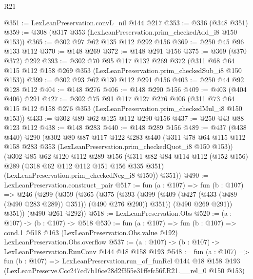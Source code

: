 \begin{lexlean}{R21}
\begin{coremodule}
@351 := LexLeanPreservation.convL_nil @144 @217
@353 := @336 (@348 @351)
@359 := @308 (@317 @353 (LexLeanPreservation.prim_checkedAdd_i8 @150 @153))
@365 := @302 @97 @62 @135 @112 @292 @156
@369 := @250 @45 @96 @133 @112
@370 := @148 @269
@372 := @148 @291 @156
@375 := @369 (@370 @372) @292
@393 := @302
    @70
    @95
    @117
    @132
    @269
    @372
    (@311 @68 @64 @115 @112 @158 @269 @353 (LexLeanPreservation.prim_checkedSub_i8 @150 @153))
@399 := @302 @93 @62 @130 @112 @291 @156
@403 := @250 @44 @92 @128 @112
@404 := @148 @276
@406 := @148 @290 @156
@409 := @403 (@404 @406) @291
@427 := @302
    @75
    @91
    @117
    @127
    @276
    @406
    (@311 @73 @64 @115 @112 @158 @276 @353 (LexLeanPreservation.prim_checkedMul_i8 @150 @153))
@433 := @302 @89 @62 @125 @112 @290 @156
@437 := @250 @43 @88 @123 @112
@438 := @148 @283
@440 := @148 @289 @156
@489 := @437
    (@438 @440)
    @290
    (@302
      @80
      @87
      @117
      @122
      @283
      @440
      (@311 @78 @64 @115 @112 @158 @283 @353 (LexLeanPreservation.prim_checkedQuot_i8 @150 @153))
      (@302
        @85
        @62
        @120
        @112
        @289
        @156
        (@311
          @82
          @84
          @114
          @112
          (@152 @156)
          @289
          (@318 @62 @112 @112 @151 @156 @335 @351)
          (LexLeanPreservation.prim_checkedNeg_i8 @150))
        @351))
@490 := LexLeanPreservation.construct_pair
@517 := fun (a : @107) =>
  fun (b : @107) =>
  @246
    (@299
      (@359
        (@365
          (@375
            (@393 (@399 (@409 (@427 (@433 (@489 (@490 @283 @289)) @351)) (@490 @276 @290)) @351))
            (@490 @269 @291))
          @351))
      (@490 @261 @292))
@518 := LexLeanPreservation.Obs
@520 := (a : @107) -> (b : @107) -> @518
@530 := fun (a : @107) =>
  fun (b : @107) =>
  cond.{1} @518 @163 (LexLeanPreservation.Obs.value @192) LexLeanPreservation.Obs.overflow
@537 := (a : @107) -> (b : @107) -> LexLeanPreservation.RunConv @144 @18 @158 @193
@548 := fun (a : @107) =>
  fun (b : @107) =>
  LexLeanPreservation.run_of_funRel
    @144
    @18
    @158
    @193
    (LexLeanPreserve.Ccc247cd7b16ce28d2f355e31ffefc56f.R21.__rel_0 @150 @153)
\end{coremodule}
\end{lexlean}
